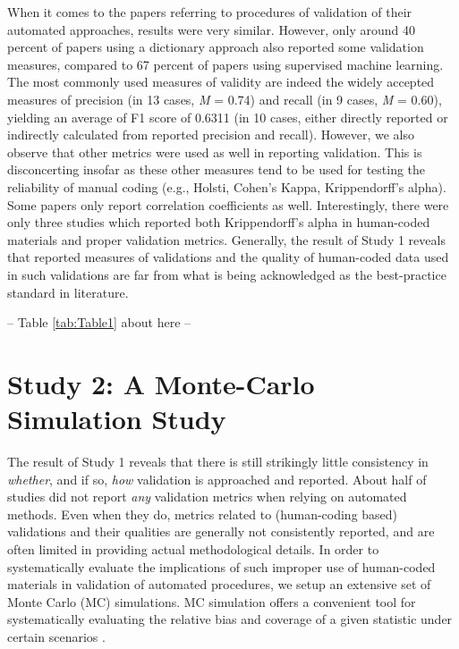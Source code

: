 \documentclass[man, 12pt, a4paper, nolmodern, noextraspace]{apa6}
\begin{document}
    When it comes to the papers referring to procedures of validation of their automated approaches, results were very similar. However, only around 40 percent of papers using a dictionary approach also reported some validation measures, compared to 67 percent of papers using supervised machine learning. The most commonly used measures of validity are indeed the widely accepted measures of precision (in 13 cases, \textit{M} = 0.74) and recall (in 9 cases, \textit{M} = 0.60), yielding an average of F1 score of 0.6311 (in 10 cases, either directly reported or indirectly calculated from reported precision and recall). However, we also observe that other metrics were used as well in reporting validation. This is disconcerting insofar as these other measures tend to be used for testing the reliability of manual coding (e.g., Holsti, Cohen’s Kappa, Krippendorff’s alpha). Some papers only report correlation coefficients as well. Interestingly, there were only three studies which reported both Krippendorff’s alpha in human-coded materials and proper validation metrics. Generally, the result of Study 1 reveals that reported measures of validations and the quality of human-coded data used in such validations are far from what is being acknowledged as the best-practice standard in literature.
    \centerline{ -- Table \ref{tab:Table1} about here -- }    

\section{Study 2: A Monte-Carlo Simulation Study}
    
    The result of Study 1 reveals that there is still strikingly little consistency in \textit{whether}, and if so, \textit{how} validation is approached and reported. About half of studies did not report \textit{any} validation metrics when relying on automated methods. Even when they do, metrics related to (human-coding based) validations and their qualities are generally not consistently reported, and are often limited in providing actual methodological details. In order to systematically evaluate the implications of such improper use of human-coded materials in validation of automated procedures, we setup an extensive set of Monte Carlo (MC) simulations. MC simulation offers a convenient tool for systematically evaluating the relative bias and coverage of a given statistic under certain scenarios \parencites[][]{scharkow2017measurement, leemann2017extending}.
    
\end{document}
